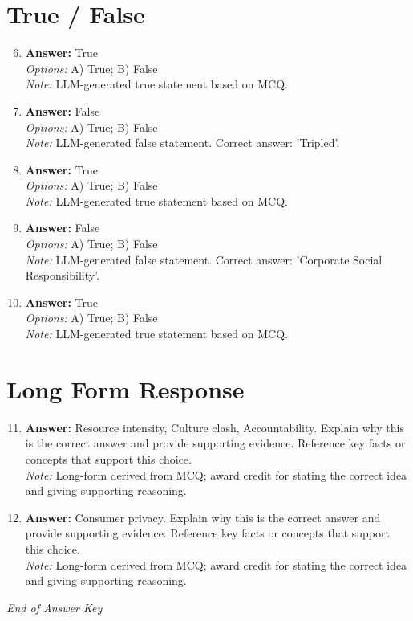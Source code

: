 \documentclass[12pt]{article}
\begin{document}
\section*{True / False}
\begin{enumerate}[label=\arabic*.]
\setcounter{enumi}{5}
\item \textbf{Answer:} True
\\ \textit{Options:} A) True; B) False
\\ \textit{Note:} LLM-generated true statement based on MCQ.
\item \textbf{Answer:} False
\\ \textit{Options:} A) True; B) False
\\ \textit{Note:} LLM-generated false statement. Correct answer: 'Tripled'.
\item \textbf{Answer:} True
\\ \textit{Options:} A) True; B) False
\\ \textit{Note:} LLM-generated true statement based on MCQ.
\item \textbf{Answer:} False
\\ \textit{Options:} A) True; B) False
\\ \textit{Note:} LLM-generated false statement. Correct answer: 'Corporate Social Responsibility'.
\item \textbf{Answer:} True
\\ \textit{Options:} A) True; B) False
\\ \textit{Note:} LLM-generated true statement based on MCQ.
\end{enumerate}

\section*{Long Form Response}
\begin{enumerate}[label=\arabic*.]
\setcounter{enumi}{10}
\item \textbf{Answer:} Resource intensity, Culture clash, Accountability. Explain why this is the correct answer and provide supporting evidence. Reference key facts or concepts that support this choice.
\\ \textit{Note:} Long-form derived from MCQ; award credit for stating the correct idea and giving supporting reasoning.
\item \textbf{Answer:} Consumer privacy. Explain why this is the correct answer and provide supporting evidence. Reference key facts or concepts that support this choice.
\\ \textit{Note:} Long-form derived from MCQ; award credit for stating the correct idea and giving supporting reasoning.
\end{enumerate}

\vfill
\noindent\textit{End of Answer Key}
\end{document}

